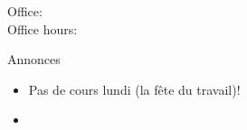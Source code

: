 \documentclass{beamer}
\subtitle[Grands nombres et adjectifs invariables]{Les grands nombres et les adjectifs invariables}
\begin{document}
  \begin{frame}
    \titlepage
    \tiny{Office: \\
          Office hours: }
  \end{frame}

  \begin{frame}{Annonces}
    \begin{itemize}
      \item Pas de cours lundi (la fête du travail)!
      \item {}
    \end{itemize}
  \end{frame}
  
\end{document}
